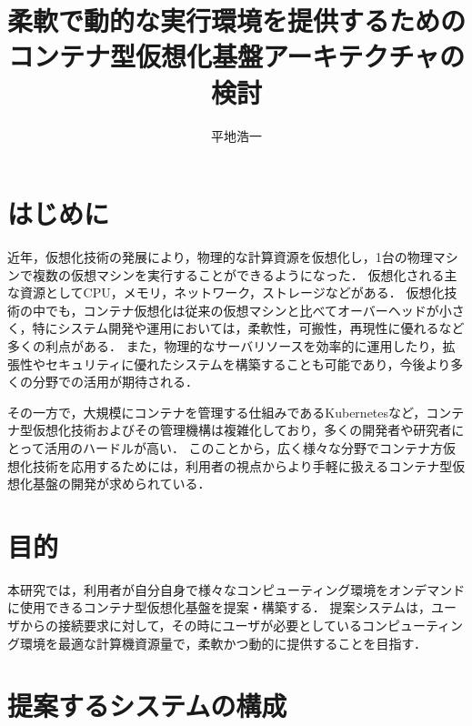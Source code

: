 \documentclass[dvipdfmx]{cs-handout}
\title{柔軟で動的な実行環境を提供するための\\コンテナ型仮想化基盤アーキテクチャの検討}
\author{平地浩一}
\newcommand{\Note}[1]{\noindent \textbf{\textcolor{blue}{#1}}}
\begin{document}
\maketitle

\section{はじめに}

近年，仮想化技術の発展により，物理的な計算資源を仮想化し，1台の物理マシンで複数の仮想マシンを実行することができるようになった．
仮想化される主な資源としてCPU，メモリ，ネットワーク，ストレージなどがある．
仮想化技術の中でも，コンテナ仮想化は従来の仮想マシンと比べてオーバーヘッドが小さく，特にシステム開発や運用においては，柔軟性，可搬性，再現性に優れるなど多くの利点がある．
また，物理的なサーバリソースを効率的に運用したり，拡張性やセキュリティに優れたシステムを構築することも可能であり，今後より多くの分野での活用が期待される．

その一方で，大規模にコンテナを管理する仕組みであるKubernetesなど，コンテナ型仮想化技術およびその管理機構は複雑化しており，多くの開発者や研究者にとって活用のハードルが高い．
このことから，広く様々な分野でコンテナ方仮想化技術を応用するためには，利用者の視点からより手軽に扱えるコンテナ型仮想化基盤の開発が求められている．

\section{目的}

本研究では，利用者が自分自身で様々なコンピューティング環境をオンデマンドに使用できるコンテナ型仮想化基盤を提案・構築する．
提案システムは，ユーザからの接続要求に対して，その時にユーザが必要としているコンピューティング環境を最適な計算機資源量で，柔軟かつ動的に提供することを目指す．

\section{提案するシステムの構成}
\end{document}
